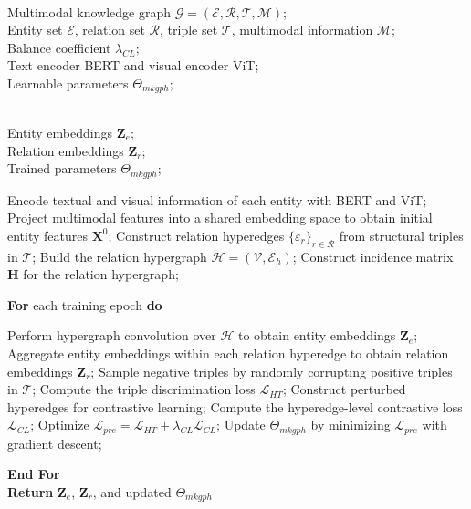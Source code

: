 \documentclass[pdflatex,sn-mathphys-num]{sn-jnl}
\begin{document}
\begin{algorithm}[t]
\caption{Pre-training Procedure of MKGPH}
\label{alg:mkgph}
\begin{algorithmic}[1]

\REQUIRE \ \\
Multimodal knowledge graph $\mathcal{G}=(\mathcal{E},\mathcal{R},\mathcal{T},\mathcal{M})$;\\
Entity set $\mathcal{E}$, relation set $\mathcal{R}$, triple set $\mathcal{T}$, multimodal information $\mathcal{M}$;\\
Balance coefficient $\lambda_{CL}$;\\
Text encoder BERT and visual encoder ViT;\\
Learnable parameters $\Theta_{mkgph}$;

\ENSURE \ \\
Entity embeddings $\mathbf{Z}_{e}$;\\
Relation embeddings $\mathbf{Z}_{r}$;\\
Trained parameters $\Theta_{mkgph}$;

\STATE Encode textual and visual information of each entity with BERT and ViT;
\STATE Project multimodal features into a shared embedding space to obtain initial entity features $\mathbf{X}^{0}$;
\STATE Construct relation hyperedges $\{\varepsilon_r\}_{r\in\mathcal{R}}$ from structural triples in $\mathcal{T}$;
\STATE Build the relation hypergraph $\mathcal{H}=(\mathcal{V},\mathcal{E}_{h})$;
\STATE Construct incidence matrix $\mathbf{H}$ for the relation hypergraph;

\STATE \textbf{For} {each training epoch} \textbf{do}

    \STATE \hspace{0.5cm} Perform hypergraph convolution over $\mathcal{H}$ to obtain entity embeddings $\mathbf{Z}_{e}$;
    \STATE \hspace{0.5cm} Aggregate entity embeddings within each relation hyperedge to obtain relation embeddings $\mathbf{Z}_{r}$;
    \STATE \hspace{0.5cm} Sample negative triples by randomly corrupting positive triples in $\mathcal{T}$;
    \STATE \hspace{0.5cm} Compute the triple discrimination loss $\mathcal{L}_{HT}$;
    \STATE \hspace{0.5cm} Construct perturbed hyperedges for contrastive learning;
    \STATE \hspace{0.5cm} Compute the hyperedge-level contrastive loss $\mathcal{L}_{CL}$;
    \STATE \hspace{0.5cm} Optimize $\mathcal{L}_{pre}=\mathcal{L}_{HT}+\lambda_{CL}\mathcal{L}_{CL}$;
    \STATE \hspace{0.5cm} Update $\Theta_{mkgph}$ by minimizing $\mathcal{L}_{pre}$ with gradient descent;

\STATE \textbf{End For} \\
\STATE \textbf{Return} $\mathbf{Z}_{e}$, $\mathbf{Z}_{r}$, and updated $\Theta_{mkgph}$

\end{algorithmic}
\end{algorithm}
\end{document}
